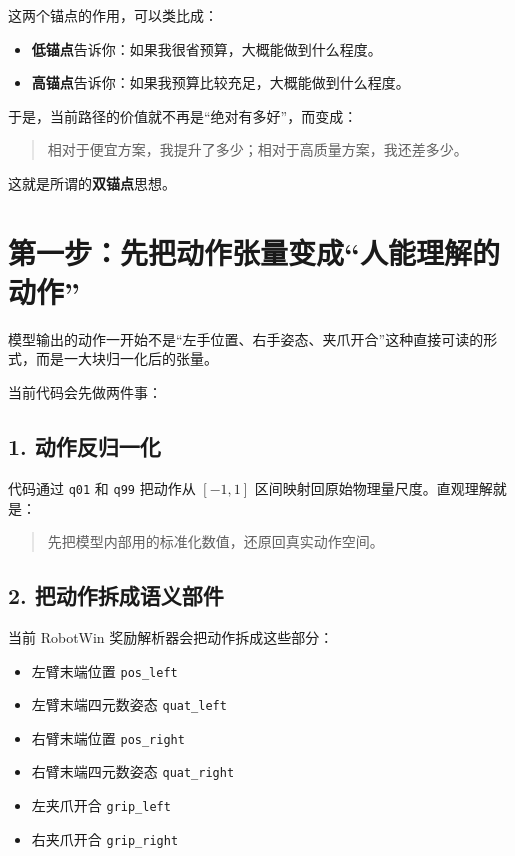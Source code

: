 \documentclass[12pt]{ctexart}
\begin{document}
这两个锚点的作用，可以类比成：

\begin{itemize}
    \item \textbf{低锚点}告诉你：如果我很省预算，大概能做到什么程度。
    \item \textbf{高锚点}告诉你：如果我预算比较充足，大概能做到什么程度。
\end{itemize}

于是，当前路径的价值就不再是“绝对有多好”，而变成：

\begin{quote}
    相对于便宜方案，我提升了多少；相对于高质量方案，我还差多少。
\end{quote}

这就是所谓的\textbf{双锚点}思想。

\section{第一步：先把动作张量变成“人能理解的动作”}

模型输出的动作一开始不是“左手位置、右手姿态、夹爪开合”这种直接可读的形式，而是一大块归一化后的张量。

当前代码会先做两件事：

\subsection{1. 动作反归一化}

代码通过 \texttt{q01} 和 \texttt{q99} 把动作从 $[-1,1]$ 区间映射回原始物理量尺度。直观理解就是：

\begin{quote}
    先把模型内部用的标准化数值，还原回真实动作空间。
\end{quote}

\subsection{2. 把动作拆成语义部件}

当前 RobotWin 奖励解析器会把动作拆成这些部分：

\begin{itemize}
    \item 左臂末端位置 \texttt{pos\_left}
    \item 左臂末端四元数姿态 \texttt{quat\_left}
    \item 右臂末端位置 \texttt{pos\_right}
    \item 右臂末端四元数姿态 \texttt{quat\_right}
    \item 左夹爪开合 \texttt{grip\_left}
    \item 右夹爪开合 \texttt{grip\_right}
\end{itemize}
\end{document}
